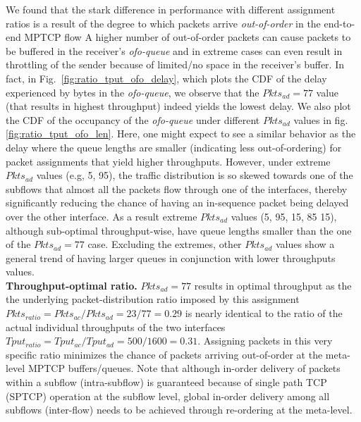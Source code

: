 We found that the stark difference in performance with different
assignment ratios is a result of the degree to which packets arrive
\textit{out-of-order} in the end-to-end MPTCP flow 
A higher number of out-of-order packets can cause
packets to be buffered in the receiver's \emph{ofo-queue} and in
extreme cases can even result in throttling of the sender because of
limited/no space in the receiver's buffer. In fact, in
Fig.~\ref{fig:ratio_tput_ofo_delay}, which plots the CDF of the delay
experienced by bytes in the \emph{ofo-queue}, we observe that
the $Pkts_{ad}=77$ value (that results in highest throughput) indeed
yields the lowest delay. 
We also plot the CDF of the
occupancy of the \emph{ofo-queue} under different $Pkts_{ad}$
values in fig. \ref{fig:ratio_tput_ofo_len}. Here, one might expect to
see a similar behavior as the delay where the queue lengths are smaller
(indicating less out-of-ordering) for packet assignments that yield
higher throughputs. However, under extreme $Pkts_{ad}$ values
(e.g, 5, 95), the traffic distribution is so skewed towards one of
the subflows that almost all the packets flow through one of
the interfaces, thereby significantly reducing the chance of having an
in-sequence packet being delayed over the other interface. As a result
extreme $Pkts_{ad}$ values (5, 95, 15, 85 15), although sub-optimal
throughput-wise, have queue lengths smaller than the one of the $Pkts_{ad}=77$ case.
Excluding the extremes, other $Pkts_{ad}$ values show a general trend of
having larger queues in conjunction with lower throughputs values.
\fi
\\
\noindent\textbf{Throughput-optimal ratio.} $Pkts_{ad}=77$ results in optimal throughput as the
the underlying packet-distribution ratio imposed by this assignment
$Pkts_{ratio}=Pkts_{ac}/Pkts_{ad}=23/77=0.29$ is nearly identical to
the ratio of the actual individual throughputs of the two interfaces
$Tput_{ratio}=Tput_{ac}/Tput_{ad}=500/1600=0.31$. Assigning packets in
this very specific ratio minimizes the chance of packets arriving
out-of-order at the meta-level MPTCP buffers/queues. 
Note that
although in-order delivery of packets within a subflow (intra-subflow)
is guaranteed because of single path TCP (SPTCP) operation at the subflow level,
global in-order delivery among all subflows (inter-flow) needs
to be achieved through re-ordering at the meta-level.
\fi
